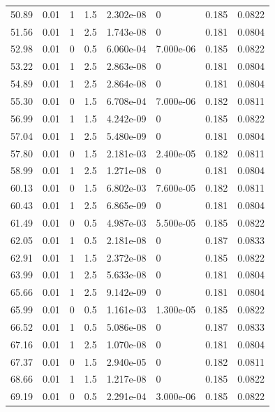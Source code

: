 \documentclass[preview]{standalone}
\begin{document}
{{{\begin{tabular}{L{1.2cm}C{1.2cm} C{0.3cm}C{0.5cm} C{1.4cm}C{1.4cm} C{1.4cm}C{1.4cm}}
  50.89  &  0.01  & 1     & 1.5 &  2.302e-08  & 0  & 0.185 &  0.0822   \\ 
  51.56  &  0.01  & 1     & 2.5 &  1.743e-08  & 0  & 0.181 &  0.0804   \\ 
  52.98  &  0.01  & 0     & 0.5 &  6.060e-04  & 7.000e-06  & 0.185 &  0.0822   \\ 
  53.22  &  0.01  & 1     & 2.5 &  2.863e-08  & 0  & 0.181 &  0.0804   \\ 
  54.89  &  0.01  & 1     & 2.5 &  2.864e-08  & 0  & 0.181 &  0.0804   \\ 
  55.30  &  0.01  & 0     & 1.5 &  6.708e-04  & 7.000e-06  & 0.182 &  0.0811   \\ 
  56.99  &  0.01  & 1     & 1.5 &  4.242e-09  & 0  & 0.185 &  0.0822   \\ 
  57.04  &  0.01  & 1     & 2.5 &  5.480e-09  & 0  & 0.181 &  0.0804   \\ 
  57.80  &  0.01  & 0     & 1.5 &  2.181e-03  & 2.400e-05  & 0.182 &  0.0811   \\ 
  58.99  &  0.01  & 1     & 2.5 &  1.271e-08  & 0  & 0.181 &  0.0804   \\ 
  60.13  &  0.01  & 0     & 1.5 &  6.802e-03  & 7.600e-05  & 0.182 &  0.0811   \\ 
  60.43  &  0.01  & 1     & 2.5 &  6.865e-09  & 0  & 0.181 &  0.0804   \\ 
  61.49  &  0.01  & 0     & 0.5 &  4.987e-03  & 5.500e-05  & 0.185 &  0.0822   \\ 
  62.05  &  0.01  & 1     & 0.5 &  2.181e-08  & 0  & 0.187 &  0.0833   \\ 
  62.91  &  0.01  & 1     & 1.5 &  2.372e-08  & 0  & 0.185 &  0.0822   \\ 
  63.99  &  0.01  & 1     & 2.5 &  5.633e-08  & 0  & 0.181 &  0.0804   \\ 
  65.66  &  0.01  & 1     & 2.5 &  9.142e-09  & 0  & 0.181 &  0.0804   \\ 
  65.99  &  0.01  & 0     & 0.5 &  1.161e-03  & 1.300e-05  & 0.185 &  0.0822   \\ 
  66.52  &  0.01  & 1     & 0.5 &  5.086e-08  & 0  & 0.187 &  0.0833   \\ 
  67.16  &  0.01  & 1     & 2.5 &  1.070e-08  & 0  & 0.181 &  0.0804   \\ 
  67.37  &  0.01  & 0     & 1.5 &  2.940e-05  & 0  & 0.182 &  0.0811   \\ 
  68.66  &  0.01  & 1     & 1.5 &  1.217e-08  & 0  & 0.185 &  0.0822   \\ 
  69.19  &  0.01  & 0     & 0.5 &  2.291e-04  & 3.000e-06  & 0.185 &  0.0822   \\ 

\end{tabular}}}}
\end{document}

